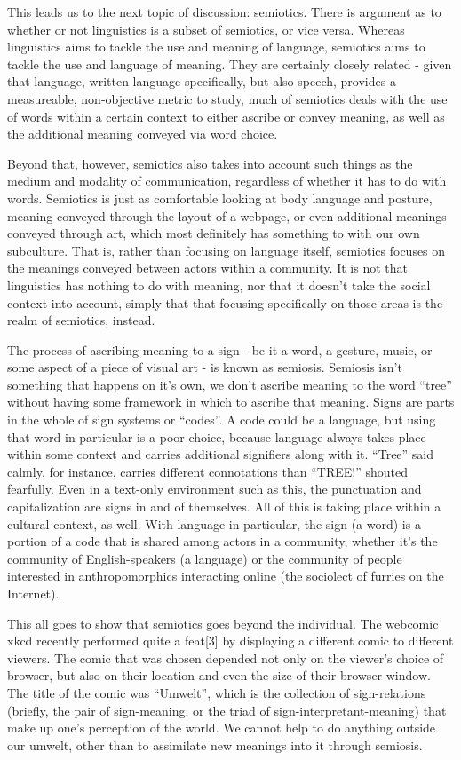 This leads us to the next topic of discussion: semiotics. There is
argument as to whether or not linguistics is a subset of semiotics, or
vice versa. Whereas linguistics aims to tackle the use and meaning of
language, semiotics aims to tackle the use and language of meaning. They
are certainly closely related - given that language, written language
specifically, but also speech, provides a measureable, non-objective
metric to study, much of semiotics deals with the use of words within a
certain context to either ascribe or convey meaning, as well as the
additional meaning conveyed via word choice.

Beyond that, however, semiotics also takes into account such things as
the medium and modality of communication, regardless of whether it has
to do with words. Semiotics is just as comfortable looking at body
language and posture, meaning conveyed through the layout of a webpage,
or even additional meanings conveyed through art, which most definitely
has something to with our own subculture. That is, rather than focusing
on language itself, semiotics focuses on the meanings conveyed between
actors within a community. It is not that linguistics has nothing to do
with meaning, nor that it doesn't take the social context into account,
simply that that focusing specifically on those areas is the realm of
semiotics, instead.

The process of ascribing meaning to a sign - be it a word, a gesture,
music, or some aspect of a piece of visual art - is known as semiosis.
Semiosis isn't something that happens on it's own, we don't ascribe
meaning to the word ``tree'' without having some framework in which to
ascribe that meaning. Signs are parts in the whole of sign systems or
``codes''. A code could be a language, but using that word in particular
is a poor choice, because language always takes place within some
context and carries additional signifiers along with it. ``Tree'' said
calmly, for instance, carries different connotations than ``TREE!''
shouted fearfully. Even in a text-only environment such as this, the
punctuation and capitalization are signs in and of themselves. All of
this is taking place within a cultural context, as well. With language
in particular, the sign (a word) is a portion of a code that is shared
among actors in a community, whether it's the community of
English-speakers (a language) or the community of people interested in
anthropomorphics interacting online (the sociolect of furries on the
Internet).

This all goes to show that semiotics goes beyond the individual. The
webcomic xkcd recently performed quite a feat{[}3{]} by displaying a
different comic to different viewers. The comic that was chosen depended
not only on the viewer's choice of browser, but also on their location
and even the size of their browser window. The title of the comic was
``Umwelt'', which is the collection of sign-relations (briefly, the pair
of sign-meaning, or the triad of sign-interpretant-meaning) that make up
one's perception of the world. We cannot help to do anything outside our
umwelt, other than to assimilate new meanings into it through semiosis.


